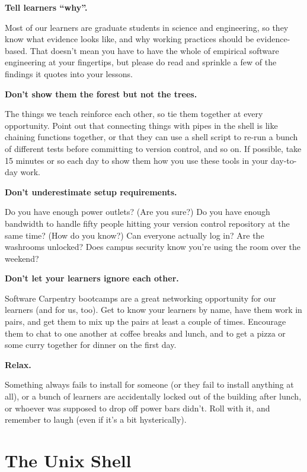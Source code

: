 \documentclass{book}
\begin{document}
\textbf{Tell learners ``why''.}

Most of our learners are graduate students in science and engineering,
so they know what evidence looks like, and why working practices should
be evidence-based. That doesn't mean you have to have the whole of
empirical software engineering at your fingertips, but please do read
\emph{} and sprinkle a few of the
findings it quotes into your lessons.

\textbf{Don't show them the forest but not the trees.}

The things we teach reinforce each other, so tie them together at every
opportunity. Point out that connecting things with pipes in the shell is
like chaining functions together, or that they can use a shell script to
re-run a bunch of different tests before committing to version control,
and so on. If possible, take 15 minutes or so each day to show them how
you use these tools in your day-to-day work.

\textbf{Don't underestimate setup requirements.}

Do you have enough power outlets? (Are you sure?) Do you have enough
bandwidth to handle fifty people hitting your version control repository
at the same time? (How do you know?) Can everyone actually log in? Are
the washrooms unlocked? Does campus security know you're using the room
over the weekend?

\textbf{Don't let your learners ignore each other.}

Software Carpentry bootcamps are a great networking opportunity for our
learners (and for us, too). Get to know your learners by name, have them
work in pairs, and get them to mix up the pairs at least a couple of
times. Encourage them to chat to one another at coffee breaks and lunch,
and to get a pizza or some curry together for dinner on the first day.

\textbf{Relax.}

Something always fails to install for someone (or they fail to install
anything at all), or a bunch of learners are accidentally locked out of
the building after lunch, or whoever was supposed to drop off power bars
didn't. Roll with it, and remember to laugh (even if it's a bit
hysterically).

\section{The Unix Shell}
\end{document}
